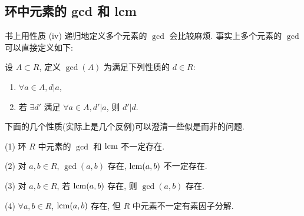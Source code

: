 \documentclass[color=black,device=normal,lang=cn,mode=geye]{elegantnote}
\begin{document}
\subsection{环中元素的 gcd 和 lcm}
书上用性质 (iv) 递归地定义多个元素的 $\gcd$ 会比较麻烦. 事实上多个元素的 $\gcd$ 可以直接定义如下:
\begin{definition}
    设 $A\subset R$, 定义 $\gcd(A)$ 为满足下列性质的 $d\in R$:
    \begin{enumerate}
        \item $\forall a\in A,d|a$,
        \item 若 $\exists d'$ 满足 $\forall a\in A,d'|a$, 则 $d'|d$.
    \end{enumerate}
\end{definition}
下面的几个性质(实际上是几个反例)可以澄清一些似是而非的问题.
\begin{property}
    (1) 环 $R$ 中元素的 $\gcd$ 和 $\operatorname{lcm} $ 不一定存在.

    (2) 对 $a,b\in R$, $\gcd(a,b)$ 存在, $\operatorname{lcm} (a,b)$ 不一定存在.

    (3) 对 $a,b\in R$, 若 $\operatorname{lcm} (a,b)$ 存在, 则 $\gcd(a,b)$ 存在.

    (4) $\forall a,b\in R$, $\operatorname{lcm} (a,b)$ 存在, 但 $R$ 中元素不一定有素因子分解.
\end{property}
\end{document}
